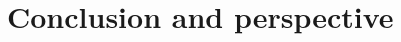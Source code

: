 \documentclass[table]{report}
\begin{document}
\chapter{Conclusion and perspective}
\minitoc
%






\nocite{*}





\listoffigures

\end{document}
